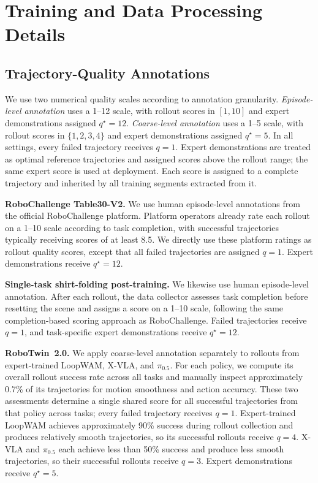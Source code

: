 
\clearpage
\appendix



\section{Training and Data Processing Details}
\label{app:implementation}

\subsection{Trajectory-Quality Annotations}
\label{app:quality_annotations}

We use two numerical quality scales according to annotation granularity.
\emph{Episode-level annotation} uses a 1--12 scale, with rollout scores in $[1,10]$ and expert demonstrations assigned $q^\star=12$.
\emph{Coarse-level annotation} uses a 1--5 scale, with rollout scores in $\{1,2,3,4\}$ and expert demonstrations assigned $q^\star=5$.
In all settings, every failed trajectory receives $q=1$.
Expert demonstrations are treated as optimal reference trajectories and assigned scores above the rollout range; the same expert score is used at deployment.
Each score is assigned to a complete trajectory and inherited by all training segments extracted from it.

\textbf{RoboChallenge Table30-V2.}
We use human episode-level annotations from the official RoboChallenge platform.
Platform operators already rate each rollout on a 1--10 scale according to task completion, with successful trajectories typically receiving scores of at least 8.5.
We directly use these platform ratings as rollout quality scores, except that all failed trajectories are assigned $q=1$.
Expert demonstrations receive $q^\star=12$.

\textbf{Single-task shirt-folding post-training.}
We likewise use human episode-level annotation.
After each rollout, the data collector assesses task completion before resetting the scene and assigns a score on a 1--10 scale, following the same completion-based scoring approach as RoboChallenge.
Failed trajectories receive $q=1$, and task-specific expert demonstrations receive $q^\star=12$.

\textbf{RoboTwin~2.0.}
We apply coarse-level annotation separately to rollouts from expert-trained LoopWAM, X-VLA, and $\pi_{0.5}$.
For each policy, we compute its overall rollout success rate across all tasks and manually inspect approximately 0.7\% of its trajectories for motion smoothness and action accuracy.
These two assessments determine a single shared score for all successful trajectories from that policy across tasks; every failed trajectory receives $q=1$.
Expert-trained LoopWAM achieves approximately 90\% success during rollout collection and produces relatively smooth trajectories, so its successful rollouts receive $q=4$.
X-VLA and $\pi_{0.5}$ each achieve less than 50\% success and produce less smooth trajectories, so their successful rollouts receive $q=3$.
Expert demonstrations receive $q^\star=5$.

